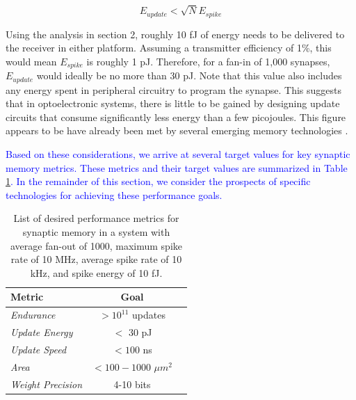 \documentclass[twocolumn]{article}
\begin{document}
\begin{equation}
    E_{update} < \sqrt{N}E_{spike}
\end{equation}

Using the analysis in section 2, roughly 10 fJ of energy needs to be delivered to the receiver in either platform. Assuming a transmitter efficiency of 1\%, this would mean $E_{spike}$ is roughly 1 pJ. Therefore, for a fan-in of 1,000 synapses, $E_{update}$ would ideally be no more than 30 pJ. Note that this value also includes any energy spent in peripheral circuitry to program the synapse. This suggests that in optoelectronic systems, there is little to be gained by designing update circuits that consume significantly less energy than a few picojoules. This figure appears to be have already been met by several emerging memory technologies \cite{zahoor2020resistive}.

\textcolor{blue}{Based on these considerations, we arrive at several target values for key synaptic memory metrics. These metrics and their target values are summarized in Table \ref{tab:memory_metrics}. In the remainder of this section, we consider the prospects of specific technologies for achieving these performance goals.}

\begin{table}[h!]
  \begin{center}
    \label{tab:memory_metrics}
    \begin{tabular}{l|c|r} %
      \textbf{Metric} & \textbf{Goal} \\
      \hline
      \textit{Endurance} & $>10^{11}$ updates \\
      \textit{Update Energy} & $<$ 30 pJ\\
      \textit{Update Speed} & $<100$ ns \\
      \textit{Area} & $<100-1000$ $\mu m ^2$ \\
      \textit{Weight Precision} & 4-10 bits \cite{pfeil20124}
      
    \end{tabular}
    \caption{List of desired performance metrics for synaptic memory in a system with average fan-out of 1000, maximum spike rate of 10 MHz, average spike rate of 10 kHz, and spike energy of 10 fJ.}
  \end{center}
\end{table}
\end{document}
